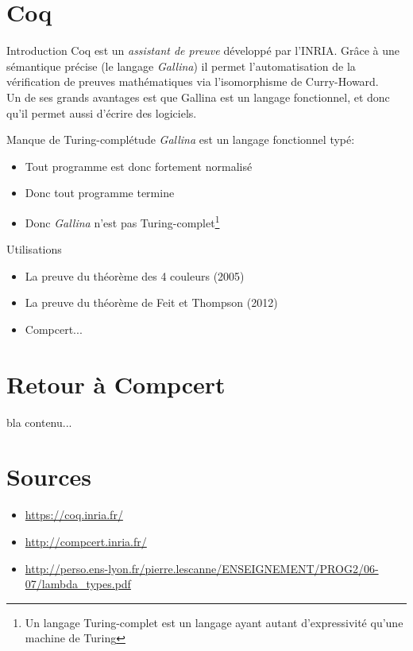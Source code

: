 \documentclass[11pt,a4paper]{beamer}
\theoremstyle{plain}
\theoremstyle{definition}
\theoremstyle{remark}
\begin{document}
\section{Coq}

\begin{frame}{Introduction}
Coq est un \emph{assistant de preuve} développé par l'INRIA. Grâce à une sémantique précise (le langage \emph{Gallina}) il permet l'automatisation de la vérification de preuves mathématiques via l'isomorphisme de Curry-Howard.\\
Un de ses grands avantages est que Gallina est un langage fonctionnel, et donc qu'il permet aussi d'écrire des logiciels.
\end{frame}

\begin{frame}{Manque de Turing-complétude}
\emph{Gallina} est un langage fonctionnel typé:
\begin{itemize}
	\item Tout programme est donc fortement normalisé
	\item Donc tout programme termine
	\item Donc \emph{Gallina} n'est pas Turing-complet\footnote{Un langage Turing-complet est un langage ayant autant d'expressivité qu'une machine de Turing}
\end{itemize}

\end{frame}

\begin{frame}{Utilisations}
	\begin{itemize}
		\item La preuve du théorème des 4 couleurs (2005)
		\item La preuve du théorème de Feit et Thompson (2012)
		\item Compcert...
	\end{itemize}
\end{frame}

\section{Retour à Compcert}

\begin{frame}{bla}
	contenu...
\end{frame}

\section*{Sources}
\begin{frame}
\begin{itemize}
	\item \url{https://coq.inria.fr/}
	\item \url{http://compcert.inria.fr/}
	\item \url{http://perso.ens-lyon.fr/pierre.lescanne/ENSEIGNEMENT/PROG2/06-07/lambda_types.pdf}
\end{itemize}
\end{frame}
\end{document}
